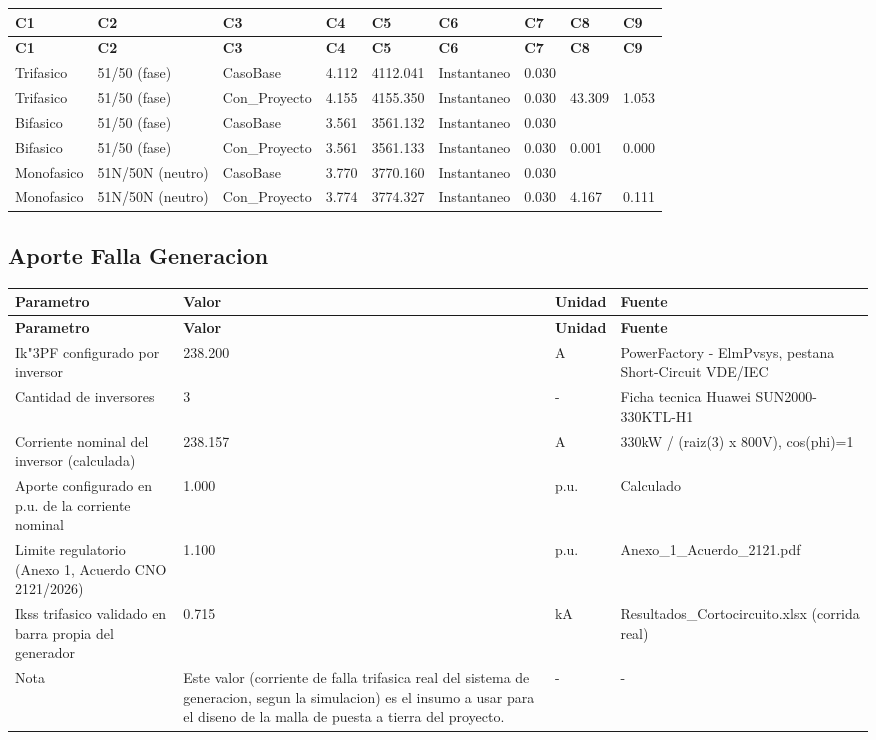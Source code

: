\documentclass[11pt,a4paper]{article}
\begin{document}
\small
\begin{longtable}{lllllllll}
\toprule
\textbf{C1} & \textbf{C2} & \textbf{C3} & \textbf{C4} & \textbf{C5} & \textbf{C6} & \textbf{C7} & \textbf{C8} & \textbf{C9} \\
\midrule
\endfirsthead
\toprule
\textbf{C1} & \textbf{C2} & \textbf{C3} & \textbf{C4} & \textbf{C5} & \textbf{C6} & \textbf{C7} & \textbf{C8} & \textbf{C9} \\
\midrule
\endhead
\bottomrule
\endfoot
Trifasico & 51/50 (fase) & CasoBase & 4.112 & 4112.041 & Instantaneo & 0.030 &  &  \\
Trifasico & 51/50 (fase) & Con\_Proyecto & 4.155 & 4155.350 & Instantaneo & 0.030 & 43.309 & 1.053 \\
Bifasico & 51/50 (fase) & CasoBase & 3.561 & 3561.132 & Instantaneo & 0.030 &  &  \\
Bifasico & 51/50 (fase) & Con\_Proyecto & 3.561 & 3561.133 & Instantaneo & 0.030 & 0.001 & 0.000 \\
Monofasico & 51N/50N (neutro) & CasoBase & 3.770 & 3770.160 & Instantaneo & 0.030 &  &  \\
Monofasico & 51N/50N (neutro) & Con\_Proyecto & 3.774 & 3774.327 & Instantaneo & 0.030 & 4.167 & 0.111 \\
\end{longtable}

\subsection{Aporte Falla Generacion}

\small
\begin{longtable}{llll}
\toprule
\textbf{Parametro} & \textbf{Valor} & \textbf{Unidad} & \textbf{Fuente} \\
\midrule
\endfirsthead
\toprule
\textbf{Parametro} & \textbf{Valor} & \textbf{Unidad} & \textbf{Fuente} \\
\midrule
\endhead
\bottomrule
\endfoot
Ik"3PF configurado por inversor & 238.200 & A & PowerFactory - ElmPvsys, pestana Short-Circuit VDE/IEC \\
Cantidad de inversores & 3 & - & Ficha tecnica Huawei SUN2000-330KTL-H1 \\
Corriente nominal del inversor (calculada) & 238.157 & A & 330kW / (raiz(3) x 800V), cos(phi)=1 \\
Aporte configurado en p.u. de la corriente nominal & 1.000 & p.u. & Calculado \\
Limite regulatorio (Anexo 1, Acuerdo CNO 2121/2026) & 1.100 & p.u. & Anexo\_1\_Acuerdo\_2121.pdf \\
Ikss trifasico validado en barra propia del generador & 0.715 & kA & Resultados\_Cortocircuito.xlsx (corrida real) \\
Nota & Este valor (corriente de falla trifasica real del sistema de generacion, segun la simulacion) es el insumo a usar para el diseno de la malla de puesta a tierra del proyecto. & - & - \\
\end{longtable}
\end{document}
